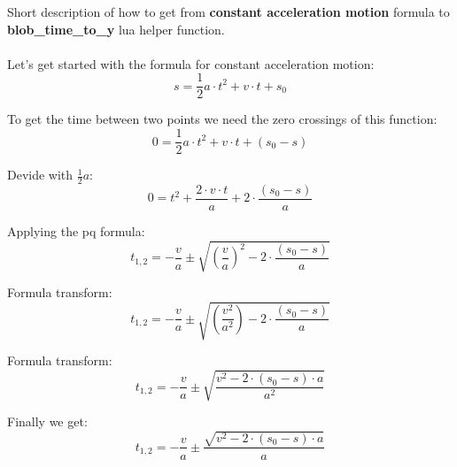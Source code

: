 \documentclass{article}
\begin{document}
\noindent
Short description of how to get from \textbf{constant acceleration motion} formula to \textbf{blob\_time\_to\_y} lua helper function.
\\\\
\noindent
Let's get started with the formula for constant acceleration motion:
\[ s = \frac{1}{2}a \cdot t^2 + v \cdot t + s_0 \]

\noindent
To get the time between two points we need the zero crossings of this function:
\[ 0 = \frac{1}{2}a \cdot t^2 + v \cdot t + (s_0 - s) \]

\noindent
Devide with $ \frac{1}{2}a $:
\[ 0 = t^2 + \frac{2 \cdot v \cdot t}{a} + 2 \cdot \frac{(s_0 - s)}{a} \]

\noindent
Applying the pq formula:
\[ t_{1,2} = -\frac{v}{a} \pm \sqrt{ (\frac{v}{a})^2 - 2 \cdot \frac{(s_0 - s)}{a} } \]

\noindent
Formula transform:
\[ t_{1,2} = -\frac{v}{a} \pm \sqrt{ (\frac{v^2}{a^2}) - 2 \cdot \frac{(s_0 - s)}{a} } \]

\noindent
Formula transform:
\[ t_{1,2} = -\frac{v}{a} \pm \sqrt{ \frac{v^2 - 2 \cdot (s_0 - s) \cdot a}{a^2} } \]

\noindent
Finally we get:
\[ t_{1,2} = -\frac{v}{a} \pm \frac{\sqrt{ v^2 - 2 \cdot (s_0 - s) \cdot a }}{a} \]
\end{document}
